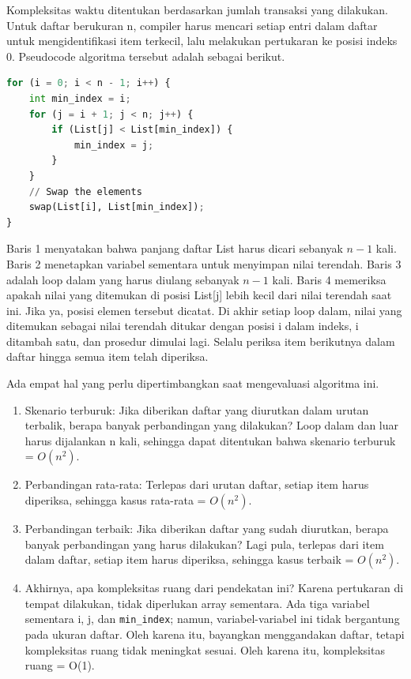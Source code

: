 \documentclass{article}
\begin{document}
Kompleksitas waktu ditentukan berdasarkan jumlah transaksi yang dilakukan. Untuk daftar berukuran n, compiler harus mencari setiap entri dalam daftar untuk mengidentifikasi item terkecil, lalu melakukan pertukaran ke posisi indeks 0. Pseudocode algoritma tersebut adalah sebagai berikut.
\begin{lstlisting}[language=Python, caption={}, captionpos=b]
for (i = 0; i < n - 1; i++) {
    int min_index = i;
    for (j = i + 1; j < n; j++) {
        if (List[j] < List[min_index]) {
            min_index = j;
        }
    }
    // Swap the elements
    swap(List[i], List[min_index]);
}
\end{lstlisting}

Baris 1 menyatakan bahwa panjang daftar List harus dicari sebanyak \(n-1\) kali. Baris 2 menetapkan variabel sementara untuk menyimpan nilai terendah. Baris 3 adalah loop dalam yang harus diulang sebanyak \(n-1\) kali. Baris 4 memeriksa apakah nilai yang ditemukan di posisi List[j] lebih kecil dari nilai terendah saat ini. Jika ya, posisi elemen tersebut dicatat. Di akhir setiap loop dalam, nilai yang ditemukan sebagai nilai terendah ditukar dengan posisi i dalam indeks, i ditambah satu, dan prosedur dimulai lagi. Selalu periksa item berikutnya dalam daftar hingga semua item telah diperiksa.

Ada empat hal yang perlu dipertimbangkan saat mengevaluasi algoritma ini.
\begin{enumerate}
    \item Skenario terburuk: Jika diberikan daftar yang diurutkan dalam urutan terbalik, berapa banyak perbandingan yang dilakukan? Loop dalam dan luar harus dijalankan n kali, sehingga dapat ditentukan bahwa skenario terburuk = \(O(n^2)\).
    \item Perbandingan rata-rata: Terlepas dari urutan daftar, setiap item harus diperiksa, sehingga kasus rata-rata = \(O(n^2)\).
    \item Perbandingan terbaik: Jika diberikan daftar yang sudah diurutkan, berapa banyak perbandingan yang harus dilakukan? Lagi pula, terlepas dari item dalam daftar, setiap item harus diperiksa, sehingga kasus terbaik = \(O(n^2)\).
    \item Akhirnya, apa kompleksitas ruang dari pendekatan ini? Karena pertukaran di tempat dilakukan, tidak diperlukan array sementara. Ada tiga variabel sementara i, j, dan \verb|min_index|; namun, variabel-variabel ini tidak bergantung pada ukuran daftar. Oleh karena itu, bayangkan menggandakan daftar, tetapi kompleksitas ruang tidak meningkat sesuai. Oleh karena itu, kompleksitas ruang = O(1).
\end{enumerate}
\end{document}
